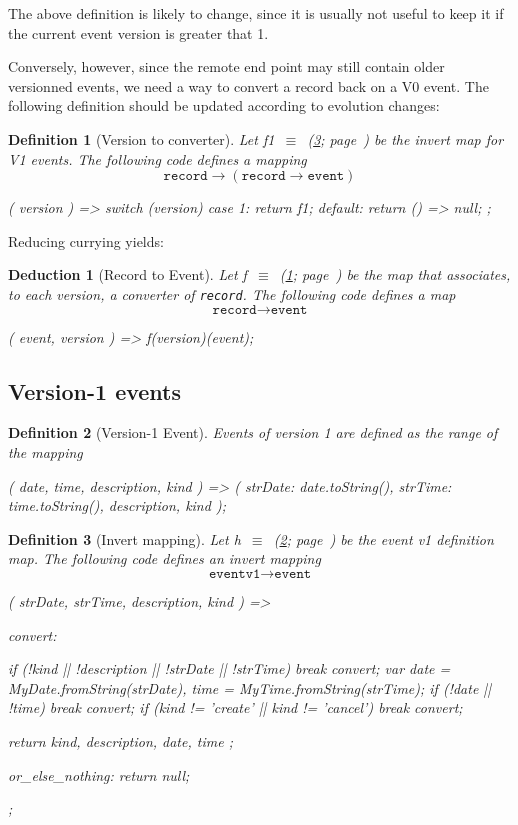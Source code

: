 \documentclass[12pt,a4paper]{report}
\newtheorem{definition}{Definition}
\newtheorem{deduction}{Deduction}
\newcommand{\word}[1]{\texttt{#1}}
\newcommand{\symboldef}[2]{#1\ $\equiv$\ (\ref{#2}; page~\pageref{#2})}
\begin{document}
The above definition is likely to change, since it is usually not useful
to keep it if the current event version is greater that 1.

Conversely, however, since the remote end point may still contain older versionned
events, we need a way to convert a record back on a V0 event.
The following definition should be updated according to evolution changes:

\begin{definition}[Version to converter]\label{version_to_record_converter}
Let \symboldef{f1}{event_v1_invert} be the invert map for V1 events.
The following code defines a mapping
	\[ \word{record}\to (\word{record}\to \word{event})\]
\begin{code}
({ version }) => {
  switch (version) {
    case 1:  return f1;
    default: return () => null;
  }
};
\end{code}
\end{definition}

Reducing currying yields:
\begin{deduction}[Record to Event]\label{record_to_event_converter}
Let \symboldef{f}{version_to_record_converter} be the map that associates, to
each version, a converter of \word{record}. The following code defines a map
	\[ \word{record}\to \word{event}\]
\begin{code}
({ event, version }) => f(version)(event);
\end{code}
\end{deduction}

\subsection{Version-1 events}

\begin{definition}[Version-1 Event]\label{event_v1}
Events of version 1 are defined as the range of the mapping
\begin{code}
({ date, time, description, kind }) => ({
  strDate: date.toString(),
  strTime: time.toString(),
  description,
  kind
});
\end{code}
\end{definition}

\begin{definition}[Invert mapping]\label{event_v1_invert}
Let \symboldef{h}{event_v1} be the event v1 definition map.
The following code defines an invert mapping
	\[ \word{eventv1}\to \word{event} \]
\begin{code}
({ strDate, strTime, description, kind }) => {
  convert: {
    if (!kind || !description || !strDate || !strTime)
      break convert;
    var date = MyDate.fromString(strDate),
        time = MyTime.fromString(strTime);
    if (!date || !time) break convert;
    if (kind != 'create' || kind != 'cancel') break convert;

    return { kind, description, date, time };
  } or_else_nothing: {
    return null;
  }
};
\end{code}
\end{definition}
\end{document}
